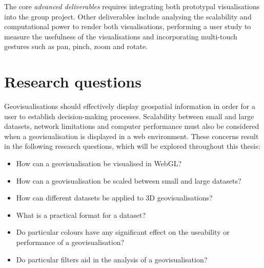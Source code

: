 {	The core \emph{advanced deliverables} requires integrating both prototypal visualisations into the group project. Other deliverables include analysing the scalability and computational power to render both visualisations, performing a user study to measure the usefulness of the visualisations and incorporating multi-touch gestures such as pan, pinch, zoom and rotate.
	
}

\section{Research questions} {
\label{sec:research_questions}

	Geovisualisations should effectively display geospatial information in order for a user to establish decision-making processes. Scalability between small and large datasets, network limitations and computer performance must also be considered when a geovisualisation is displayed in a web environment. These concerns result in the following research questions, which will be explored throughout this thesis:

	\begin{itemize}
		\item How can a geovisualisation be visualised in WebGL?
		\item How can a geovisualisation be scaled between small and large datasets?
		\item How can different datasets be applied to 3D geovisualisations?
		\item What is a practical format for a dataset?
		\item Do particular colours have any significant effect on the useability or performance of a geovisualisation?
		\item Do particular filters aid in the analysis of a geovisualisation?
	\end{itemize}

}
